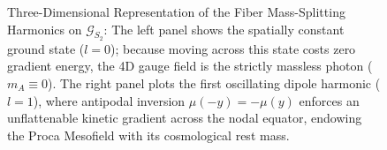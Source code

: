 \documentclass[
    12pt,
    a4paper,
    headings=normal,
    twoside=false,
    open=any,
    parskip=half
]{scrbook}
\let\hbar\relax
\begin{document}
\begin{figure}[htbp]
\caption{Three-Dimensional Representation of the Fiber Mass-Splitting Harmonics on $\mathcal{G}_{S_2}$: The left panel shows the spatially constant ground state ($l=0$); because moving across this state costs zero gradient energy, the 4D gauge field is the strictly massless photon ($m_A \equiv 0$). The right panel plots the first oscillating dipole harmonic ($l=1$), where antipodal inversion $\mu(-y) = -\mu(y)$ enforces an unflattenable kinetic gradient across the nodal equator, endowing the Proca Mesofield with its cosmological rest mass.}
\label{fig:ch2_spherical_harmonics_3d}
\end{figure}
\end{document}
